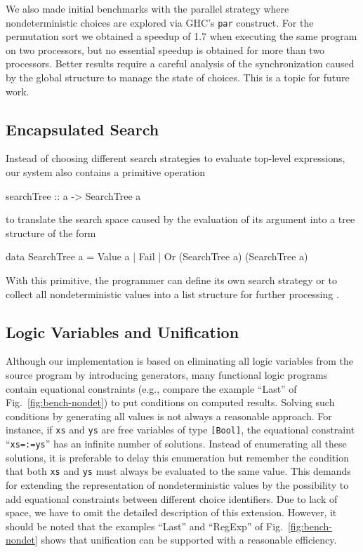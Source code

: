 \documentclass{llncs}
\newcommand{\code}[1]{\mbox{\small\texttt{#1}}}
\newcommand{\ccode}[1]{``\code{#1}''}
\begin{document}
We also made initial benchmarks with the parallel strategy
where nondeterministic choices are explored via GHC's \code{par}
construct. For the permutation sort we obtained a speedup of 1.7
when executing the same program on two processors, but no essential
speedup is obtained for more than two processors. 
Better results require a careful analysis of the synchronization
caused by the global structure to manage the state of choices.
This is a topic for future work.

\subsection{Encapsulated Search}

Instead of choosing different search strategies to evaluate
top-level expressions, our system also contains a primitive operation
\begin{curry}
 searchTree :: a -> SearchTree a
\end{curry}
to translate the search space caused by the evaluation of its argument
into a tree structure of the form
\begin{curry}
 data SearchTree a = Value a | Fail | Or (SearchTree a) (SearchTree a)
\end{curry}
With this primitive,
the programmer can define its own search strategy or to
collect all nondeterministic values into a list structure
for further processing \cite{BrasselHuch07}.


\subsection{Logic Variables and Unification}
\label{sec:unification}

Although our implementation is based on eliminating all logic
variables from the source program by introducing generators,
many functional logic programs contain equational constraints
(e.g., compare the example ``Last'' of Fig.~\ref{fig:bench-nondet})
to put conditions on computed results.
Solving such conditions by generating all values is not always
a reasonable approach. For instance, if \code{xs} and \code{ys}
are free variables of type \code{[Bool]}, the equational
constraint \ccode{xs=:=ys} has an infinite number of solutions.
Instead of enumerating all these solutions, it is preferable to
delay this enumeration but remember the condition that both
\code{xs} and \code{ys} must always be evaluated to the same value.
This demands for extending the representation of nondeterministic
values by the possibility to add equational constraints between
different choice identifiers.
Due to lack of space, we have to omit the detailed description
of this extension.
However, it should be noted that the examples
``Last'' and ``RegExp'' of Fig.~\ref{fig:bench-nondet}
shows that unification can be supported with a reasonable efficiency.
\end{document}
